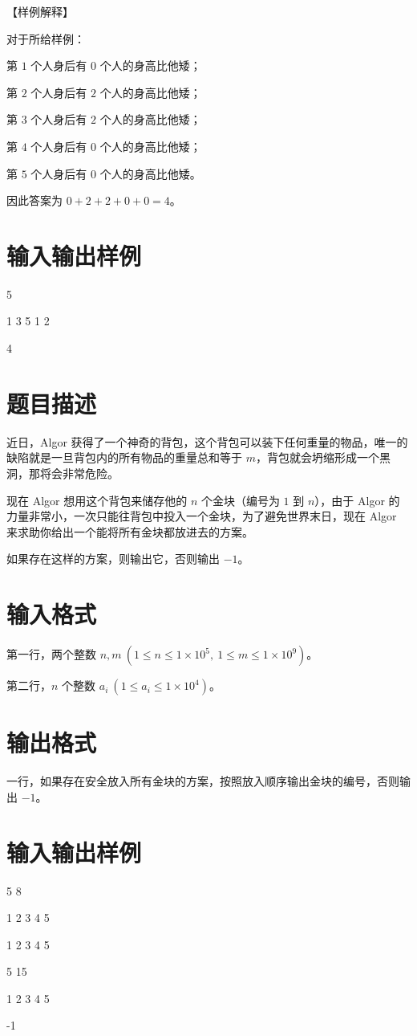 \documentclass{../cpct/ctpro}
\begin{document}
【样例解释】

对于所给样例：

第 $1$ 个人身后有 $0$ 个人的身高比他矮；

第 $2$ 个人身后有 $2$ 个人的身高比他矮；

第 $3$ 个人身后有 $2$ 个人的身高比他矮；

第 $4$ 个人身后有 $0$ 个人的身高比他矮；

第 $5$ 个人身后有 $0$ 个人的身高比他矮。

因此答案为 $0+2+2+0+0=4$。

\section*{输入输出样例}
\testcasetab
{
    5\par
    1 3 5 1 2
}
{
    4
}

\makeproblem
\section*{题目描述}

近日，Algor 获得了一个神奇的背包，这个背包可以装下任何重量的物品，唯一的缺陷就是一旦背包内的所有物品的重量总和等于 $m$，背包就会坍缩形成一个黑洞，那将会非常危险。

现在 Algor 想用这个背包来储存他的 $n$ 个金块（编号为 $1$ 到 $n$），由于 Algor 的力量非常小，一次只能往背包中投入一个金块，为了避免世界末日，现在 Algor 来求助你给出一个能将所有金块都放进去的方案。

如果存在这样的方案，则输出它，否则输出 $-1$。

\section*{输入格式}

第一行，两个整数 $n, m~(1 \leq n \leq 1 \times {10}^{5},~1 \leq m \leq 1 \times {10}^{9})$。

第二行，$n$ 个整数 $a_i~(1 \leq a_i \leq 1 \times {10}^{4})$。

\section*{输出格式}

一行，如果存在安全放入所有金块的方案，按照放入顺序输出金块的编号，否则输出 $-1$。

\section*{输入输出样例}
\testcasetab
{
    5 8\par
    1 2 3 4 5
}
{
    1 2 3 4 5
}
\testcasetab
{
    5 15\par
    1 2 3 4 5
}
{
    -1
}
\end{document}
